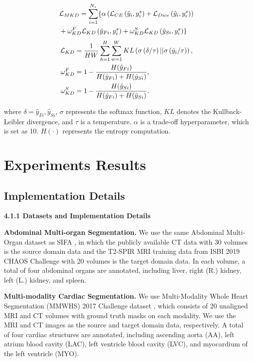 \documentclass[letterpaper]{article} %
\begin{document}
{\small
\begin{align}
    &\mathcal{L}_{MKD}=\sum_{i=1}^{N_s}\{\alpha\left(\mathcal{L}_{CE}\left(\hat{y}_{i},y_i^s\right)+\mathcal{L}_{Dice}\left(\hat{y}_{i},y_i^s \right)\right)  \notag\\
   & + \omega_{KD}^{F}\mathcal{L}_{KD} \left(\hat{y}_{Fi},y_i^s \right) + \omega_{KD}^{S}\mathcal{L}_{KD} \left(\hat{y}_{Si},y_i^s \right)\}   \label{eq7}
    \end{align}
}
{\small
\begin{align}
    \mathcal{L}_{KD} &=\frac{1}{HW}\sum_{h=1}^{H}\sum_{w=1}^{W}KL\left(\sigma\left(\delta/\tau\right)||\sigma\left(\hat{y}_{i}/\tau\right)\right), \notag \\
     \omega_{KD}^{F}& = 1 - \frac{H(\hat{y}_{Fi})}{H(\hat{y}_{Fi})+H(\hat{y}_{Si})}, \notag \\
     \omega_{KD}^{S}& = 1 - \frac{H(\hat{y}_{Si})}{H(\hat{y}_{Fi})+H(\hat{y}_{Si})}.
    \label{eq8}
\end{align}
}




\noindent
where $\delta=\hat{y}_{Fi},\hat{y}_{Si} $, $\sigma$ represents the softmax function, $KL$ denotes the Kullback-Leibler divergence, and $\tau$ is a temperature. $\alpha$
is a trade-off hyperparameter, which is set as 10. $H(\cdot)$ represents the entropy computation.

\section{Experiments Results}

\subsection{Implementation Details}

\noindent  \textbf{4.1.1 Datasets and Implementation Details}


\noindent \textbf{Abdominal Multi-organ Segmentation.} We use the same Abdominal Multi-Organ dataset as SIFA \cite{2}, in which
the publicly available CT data \cite{39} with 30 volumes is the source domain data and the T2-SPIR MRI training
data from ISBI 2019 CHAOS Challenge \cite{38} with 20 volumes is the target domain data. In each volume, a total
of four abdominal organs are annotated, including liver, right (R.) kidney, left (L.) kidney, and spleen.

\noindent \textbf{Multi-modality Cardiac Segmentation.} We use Multi-Modality Whole Heart Segmentation (MMWHS) 2017
Challenge dataset \cite{40}, which consists of 20 unaligned MRI and CT volumes with ground truth masks on each
modality. We use the MRI and CT images as the source and target domain data, respectively. A total of four
cardiac structures are annotated, including ascending aorta (AA), left atrium blood cavity (LAC), left
ventricle blood cavity (LVC), and myocardium of the left ventricle (MYO).
\end{document}
